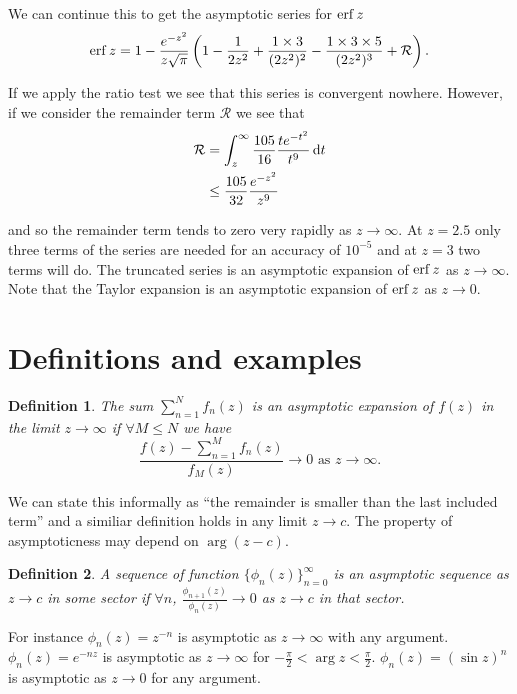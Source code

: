\documentclass{notes}
\newcommand{\cR}{\mathcal{R}}
\theoremstyle{plain}
\newtheorem*{definition}{Definition}
\begin{document}
We can continue this to get the asymptotic series for $\operatorname{erf} z$
\begin{equation}\label{eq:erfAs}
\erf z = 1 - \frac{e^{-z^2}}{z \sqrt{\pi}} \left(
1 - \frac{1}{2 z^2} + \frac{1 \times 3}{(2z^2)^2} 
- \frac{1 \times 3 \times 5}{(2z^2)^3} + \cR \right).
\end{equation}

If we apply the ratio test we see that this series is convergent nowhere.
However, if we consider the remainder term $\cR$ we see that
\begin{align*}
\cR &= \int_z^\infty \frac{105}{16} \frac{t e^{-t^2}}{t^9}\, \ud t \\
&\le \frac{105}{32} \frac{e^{-z^2}}{z^9}
\end{align*}

and so the remainder term tends to zero very rapidly as $z \to \infty$. At
$z=2.5$ only three terms of the series are needed for an accuracy of
$10^{-5}$ and at $z=3$ two terms will do.  The truncated series is an
asymptotic expansion of $\operatorname{erf} z$ as $z \to \infty$.  Note that the
Taylor expansion is an asymptotic expansion of $\operatorname{erf} z$ as $z \to 0$.

\section{Definitions and examples}

\begin{definition}
The sum $\sum_{n=1}^N f_n(z)$ is an asymptotic expansion of $f(z)$
in the limit $z \to \infty$ if $\forall M \le N$ we have
\[
\frac{f(z) - \sum_{n=1}^M f_n(z)}{f_M(z)} \to 0 \text{ as } z \to \infty.
\]
\end{definition}

We can state this informally as ``the remainder is smaller than the
last included term'' and a similiar definition holds in any limit
$z \to c$.  The property of asymptoticness may depend on
$\arg (z-c)$.

\begin{definition}
A sequence of function $\{ \phi_n(z) \}_{n=0}^\infty$ is an
asymptotic sequence as $z \to c$ in some sector if $\forall n$,
$\frac{\phi_{n+1}(z)}{\phi_n(z)} \to 0$ as $z \to c$ in that sector.
\end{definition}

For instance $\phi_n(z) = z^{-n}$ is asymptotic as $z \to \infty$ with
any argument.  $\phi_n(z) = e^{-n z}$ is asymptotic as $z \to \infty$
for $-\tfrac{\pi}{2} < \arg z < \tfrac{\pi}{2}$.  $\phi_n(z)
= \left( \sin z \right)^n$ is asymptotic as $z \to 0$ for any argument.
\end{document}
